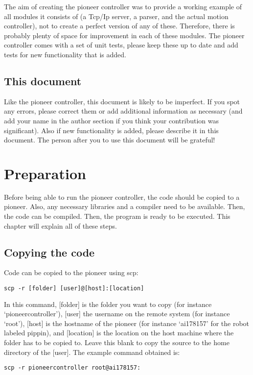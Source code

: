 \documentclass[a4paper, 12pt, oneside]{report}
\begin{document}
The aim of creating the pioneer controller was to provide a working example of
all modules it consists of (a Tcp/Ip server, a parser, and the actual motion
controller), not to create a perfect version of any of these. Therefore, there
is probably plenty of space for improvement in each of these modules. The
pioneer controller comes with a set of unit tests, please keep these up to date
and add tests for new functionality that is added.

\subsection{This document}
Like the pioneer controller, this document is likely to be imperfect. If you
spot any errors, please correct them or add additional information as necessary
(and add your name in the author section if you think your contribution was
significant). Also if new functionality is added, please describe it in this
document. The person after you to use this document will be grateful!

\section{Preparation}
Before being able to run the pioneer controller, the code should be copied to a
pioneer. Also, any necessary libraries and a compiler need to be available.
Then, the code can be compiled. Then, the program is ready to be executed. This
chapter will explain all of these steps.

\subsection{Copying the code}
Code can be copied to the pioneer using scp:

\begin{verbatim}
scp -r [folder] [user]@[host]:[location]
\end{verbatim}

In this command, [folder] is the folder you want to copy (for instance
`pioneercontroller'), [user] the username on the remote system (for instance
`root'), [host] is the hostname of the pioneer (for instance `ai178157' for the
robot labeled pippin), and [location] is the location on the host machine where
the folder has to be copied to. Leave this blank to copy the source to the home
directory of the [user]. The example command obtained is:

\begin{verbatim}
scp -r pioneercontroller root@ai178157:
\end{verbatim}
\end{document}
